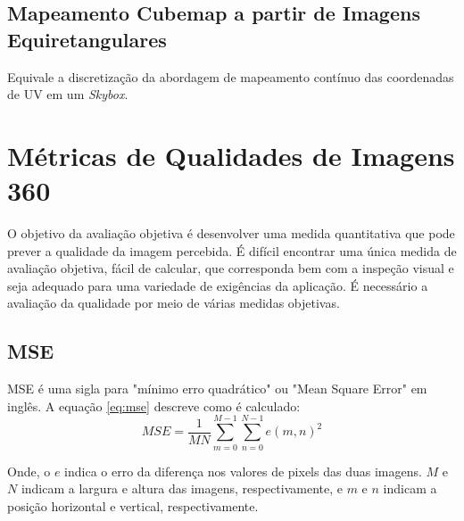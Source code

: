 \documentclass[conference]{IEEEtran}
\begin{document}
\subsection{Mapeamento Cubemap a partir de Imagens Equiretangulares} \label{subsec:equicubemap}





Equivale a discretização da abordagem de mapeamento contínuo das coordenadas de UV em um \textit{Skybox}.








\section{Métricas de Qualidades de Imagens 360}  \label{sec:metrics}

O objetivo da avaliação objetiva é desenvolver uma medida quantitativa que pode prever a qualidade da imagem percebida. É difícil encontrar uma única medida de avaliação objetiva, fácil de calcular, que corresponda bem com a inspeção visual e seja adequado para uma variedade de exigências da aplicação. É necessário a avaliação da qualidade por meio de várias medidas objetivas.




\subsection{MSE}

MSE é uma sigla para "mínimo erro quadrático" ou "Mean Square Error" em inglês. A equação \ref{eq:mse} descreve como é calculado:
\begin{equation}
MSE=\frac{1}{MN}\sum_{m=0}^{M-1}{\sum_{n=0}^{N-1}{e(m,n)^2}}
\label{eq:mse}
\end{equation}

Onde, o $e$ indica o erro da diferença nos valores de pixels das duas imagens. $M$ e $N$ indicam a largura e altura das imagens, respectivamente, e $m$ e $n$ indicam a posição horizontal e vertical, respectivamente.
\end{document}

